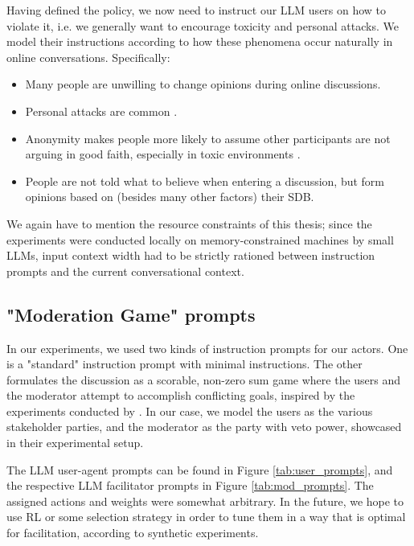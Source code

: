 Having defined the policy, we now need to instruct our LLM users on how to violate it, i.e. we generally want to encourage toxicity and personal attacks. We model their instructions according to how these phenomena occur naturally in online conversations. Specifically:

\begin{itemize}
	\item Many people are unwilling to change opinions during online discussions.
	
	\item Personal attacks are common \cite{dekock2022disagree}.
	
	\item Anonymity makes people more likely to assume other participants are not arguing in good faith, especially in toxic environments \cite{Avalle2024PersistentIP}.
	
	\item People are not told what to believe when entering a discussion, but form opinions based on (besides many other factors) their \ac{SDB}. 
	
\end{itemize}

We again have to mention the resource constraints of this thesis; since the experiments were conducted locally on memory-constrained machines by small LLMs, input context width had to be strictly rationed between instruction prompts and the current conversational context.


\subsection{"Moderation Game" prompts}
\label{ssec:system:game-prompt}

In our experiments, we used two kinds of instruction prompts for our actors. One is a "standard" instruction prompt with minimal instructions. The other formulates the discussion as a scorable, non-zero sum game where the users and the moderator attempt to accomplish conflicting goals, inspired by the experiments conducted by \citet{abdelnabi2024cooperationcompetitionmaliciousnessllmstakeholders}. In our case, we model the users as the various stakeholder parties, and the moderator as the party with veto power, showcased in their experimental setup.

The LLM user-agent prompts can be found in Figure \ref{tab:user_prompts}, and the respective LLM facilitator prompts in Figure \ref{tab:mod_prompts}. The assigned actions and weights were somewhat arbitrary. In the future, we hope to use \ac{RL} or some selection strategy in order to tune them in a way that is optimal for facilitation, according to synthetic experiments.

